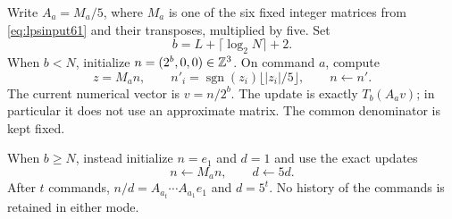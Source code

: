 Write $A_a=M_a/5$, where $M_a$ is one of the six fixed integer
matrices from \eqref{eq:lpsinput61} and their transposes, multiplied
by five. Set
\begin{equation}\label{eq:precision64}
 b=L+\lceil\log_2N\rceil+2.
\end{equation}
When $b<N$, initialize $n=(2^b,0,0)\in\mathbb Z^3$. On command $a$, compute
\begin{equation}\label{eq:integerupdate64}
 z=M_an,\qquad
 n'_i=\operatorname{sgn}(z_i)\lfloor |z_i|/5\rfloor,
 \qquad n\leftarrow n'.
\end{equation}
The current numerical vector is $v=n/2^b$. The update is exactly
$T_b(A_av)$; in particular it does not use an approximate matrix.
The common denominator is kept fixed.

When $b\ge N$, instead initialize $n=e_1$ and $d=1$ and use the exact
updates
\begin{equation}\label{eq:exactupdate64}
                       n\leftarrow M_an,\qquad d\leftarrow5d.
\end{equation}
After $t$ commands, $n/d=A_{a_t}\cdots A_{a_1}e_1$ and $d=5^t$.
No history of the commands is retained in either mode.


